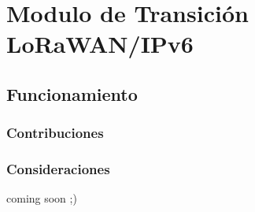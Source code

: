 \chapter{Modulo de Transición LoRaWAN/IPv6}
\section{Funcionamiento}
\subsection{Contribuciones}
\subsection{Consideraciones}
coming soon ;)